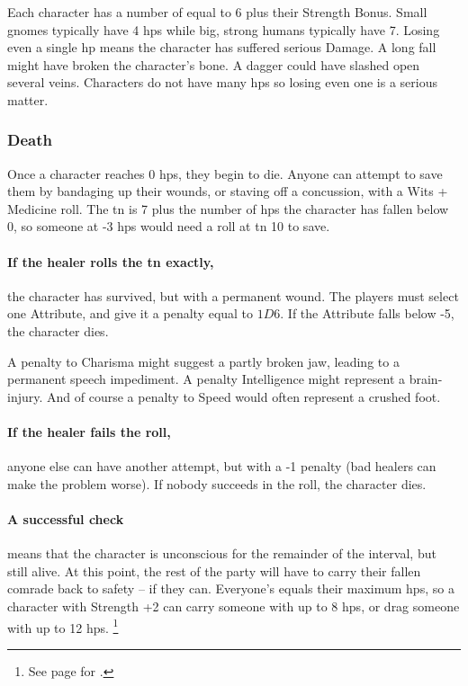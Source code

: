 \begin{multicols}{2}
\subsubsection{}

Each character has a number of  equal to 6 plus their Strength Bonus.
Small gnomes typically have 4 \glspl{hp} while big, strong humans typically have 7.
Losing even a single \gls{hp} means the character has suffered serious Damage.
A long fall might have broken the character's bone.
A dagger could have slashed open several veins.
Characters do not have many \glspl{hp} so losing even one is a serious matter.

\subsubsection{Death}
Once a character reaches 0 \glspl{hp}, they begin to die.
Anyone can attempt to save them by bandaging up their wounds, or staving off a concussion, with a Wits + Medicine roll.
The \gls{tn} is 7 plus the number of \glspl{hp} the character has fallen below 0, so someone at -3 \glspl{hp} would need a roll at \gls{tn} 10 to save.

\paragraph{If the healer rolls the \gls{tn} exactly,}
the character has survived, but with a permanent wound.
The players must select one Attribute, and give it a penalty equal to $1D6$.
If the Attribute falls below -5, the character dies.

A penalty to Charisma might suggest a partly broken jaw, leading to a permanent speech impediment.
A penalty Intelligence might represent a brain-injury.
And of course a penalty to Speed would often represent a crushed foot.

\paragraph{If the healer fails the roll,}
anyone else can have another attempt, but with a -1 penalty (bad healers can make the problem worse).
If nobody succeeds in the roll, the character dies.

\paragraph{A successful check}
means that the character is unconscious for the remainder of the interval, but still alive.
At this point, the rest of the party will have to carry their fallen comrade back to safety -- if they can.
Everyone's  equals their maximum \glspl{hp}, so a character with Strength +2 can carry someone with up to 8 \glspl{hp}, or drag someone with up to 12 \glspl{hp}.%
\footnote{See page \pageref{weight} for .}



\end{multicols}
